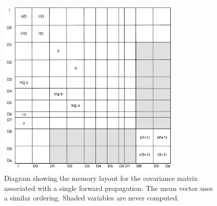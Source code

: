 \documentclass{article}
\begin{document}
\begin{figure}[ht]
\centerline{\includegraphics[width=0.8\textwidth]{prop2.pdf}}
\caption{Diagram showing the memory layout for the covariance matrix
  associated with a single forward propagation. The mean vector uses a
similar ordering. Shaded variables are never computed.}
\end{figure}
\end{document}
